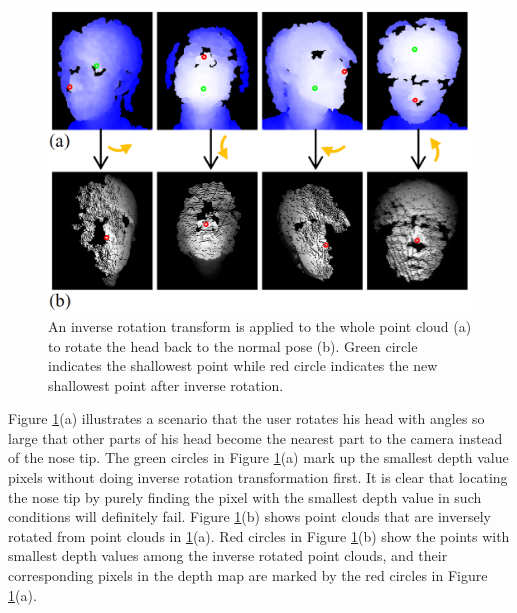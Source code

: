 \begin{figure}
\centering
\includegraphics[width=0.7\linewidth]{./figure/inverserotation.png}
\caption{An inverse rotation transform is applied to the whole point cloud (a) to rotate the head back to the normal pose (b). Green circle indicates the shallowest point while red circle indicates the new shallowest point after inverse rotation.}
\label{f:invRot}
\end{figure}

Figure \ref{f:invRot}(a) illustrates a scenario that the user rotates his head with angles so large that other parts of his head become the nearest part to the camera instead of the nose tip. The green circles in Figure \ref{f:invRot}(a) mark up the smallest depth value pixels without doing inverse rotation transformation first. It is clear that locating the nose tip by purely finding the pixel with the smallest depth value in such conditions will definitely fail. Figure \ref{f:invRot}(b) shows point clouds that are inversely rotated from point clouds in \ref{f:invRot}(a). Red circles in Figure \ref{f:invRot}(b) show the points with smallest depth values among the inverse rotated point clouds, and their corresponding pixels in the depth map are marked by the red circles in Figure \ref{f:invRot}(a).

